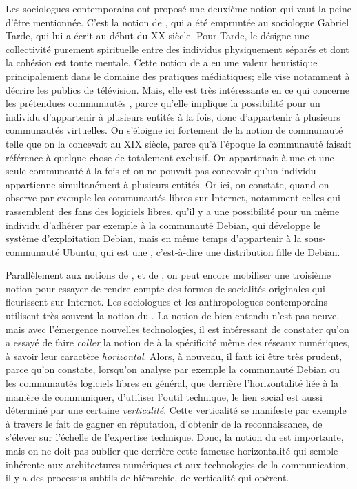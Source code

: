 {Les sociologues contemporains ont propos\'e une deuxi\`eme notion qui vaut la peine d'\^etre mentionn\'ee. C'est la notion de , qui a \'et\'e emprunt\'ee au sociologue Gabriel Tarde, qui lui a \'ecrit au d\'ebut du XX si\`ecle. Pour Tarde, le  d\'esigne une collectivit\'e purement spirituelle entre des individus physiquement s\'epar\'es et dont la coh\'esion est toute mentale. Cette notion de  a eu une valeur heuristique principalement dans le domaine des pratiques m\'ediatiques; elle vise notamment \`a d\'ecrire les publics de t\'el\'evision. Mais, elle est tr\`es int\'eressante en ce qui concerne les pr\'etendues communaut\'es , parce qu'elle implique la possibilit\'e pour un individu d'appartenir \`a plusieurs entit\'es \`a la fois, donc d'appartenir \`a plusieurs communaut\'es virtuelles. On s'\'eloigne ici fortement de la notion de communaut\'e telle que on la concevait au XIX si\`ecle, parce qu'\`a l'\'epoque la communaut\'e faisait r\'ef\'erence \`a quelque chose de totalement exclusif. On appartenait \`a une et une seule communaut\'e \`a la fois et on ne pouvait pas concevoir qu'un individu appartienne simultan\'ement \`a plusieurs entit\'es. Or ici, on constate, quand on observe par exemple les communaut\'es libres sur Internet, notamment celles qui rassemblent des fans des logiciels libres, qu'il y a une possibilit\'e pour un m\^eme individu d'adh\'erer par exemple \`a la communaut\'e Debian, qui d\'eveloppe le syst\`eme d'exploitation Debian, mais en m\^eme temps d'appartenir \`a la sous{}-communaut\'e Ubuntu, qui est une , c'est{}-\`a{}-dire une distribution fille de Debian.

Parall\`element aux notions de , et de , on peut encore mobiliser une troisi\`eme notion pour essayer de rendre compte des formes de socialit\'es originales qui fleurissent sur Internet. Les sociologues et les anthropologues contemporains utilisent tr\`es souvent la notion du . La notion de  bien entendu n'est pas neuve, mais avec l'\'emergence nouvelles technologies, il est int\'eressant de constater qu'on a essay\'e de faire {\em coller} la notion de  \`a la sp\'ecificit\'e m\^eme des r\'eseaux num\'eriques, \`a savoir leur caract\`ere {\em horizontal}. Alors, \`a nouveau, il faut ici \^etre tr\`es prudent, parce qu'on constate, lorsqu'on analyse par exemple la communaut\'e Debian ou les communaut\'es logiciels libres en g\'en\'eral, que derri\`ere l'horizontalit\'e li\'ee \`a la mani\`ere de communiquer, d'utiliser l'outil technique, le lien social est aussi d\'etermin\'e par une certaine {\em verticalit\'e}. Cette verticalit\'e se manifeste par exemple \`a travers le fait de gagner en r\'eputation, d'obtenir de la reconnaissance, de s'\'elever sur l'\'echelle de l'expertise technique. Donc, la notion du  est importante, mais on ne doit pas oublier que derri\`ere cette fameuse horizontalit\'e qui semble inh\'erente aux architectures num\'eriques et aux technologies de la communication, il y a des processus subtils de hi\'erarchie, de verticalit\'e qui op\`erent.

}
